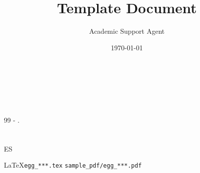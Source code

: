 \documentclass{article}
\title{Template Document}
\author{Academic Support Agent}
\date{\today}
\begin{document}
\maketitle


\section{ }

		 

	 

	 




\section{ }

\textbf{\\ \\
 \\
 }

	  

	 

	\vspace{1cm}
	\begin{thebibliography}{99}
		   -  .
	\end{thebibliography}



\section{ }

	 ES 

	\LaTeX  \texttt{egg\_***.tex}  \texttt{sample\_pdf/egg\_***.pdf} 

\end{document}
